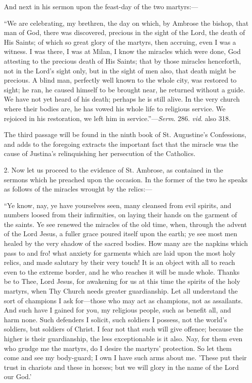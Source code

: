 And next in his sermon upon the feast-day of the two martyrs:—

``We are celebrating, my brethren, the day on which, by Ambrose
the bishop, that man of God, there was discovered, precious in the
sight of the Lord, the death of His Saints; of which so great glory of
the martyrs, then accruing, even I was a witness. I was there, I was
at Milan, I know the miracles which were done, God attesting to the
precious death of His Saints; that by those miracles henceforth, not
in the Lord's sight only, but in the sight of men also, that death might be precious. A blind man, perfectly well known to the
whole city, was restored to sight; he ran, he caused himself to be
brought near, he returned without a guide. We have not yet heard of
his death; perhaps he is still alive. In the very church where their
bodies are, he has vowed his whole life to religious service. We
rejoiced in his restoration, we left him in service.''—\emph{Serm}.
286. \emph{vid}. also 318.

The third passage will be found in the ninth book of St. Augustine's
Confessions, and adds to the foregoing extracts the important fact
that the miracle was the cause of Justina's relinquishing her
persecution of the Catholics.

2. Now let us proceed to the evidence of St. Ambrose, as contained
in the sermons which he preached upon the occasion. In the former of
the two he speaks as follows of the miracles wrought by the relics:—

``Ye know, nay, ye have yourselves seen, many cleansed from
evil spirits, and numbers loosed from their infirmities, on laying
their hands on the garment of the saints. Ye see renewed the miracles
of the old time, when, through the advent of the Lord Jesus, a fuller
grace poured itself upon the earth; ye see most men healed by the very
shadow of the sacred bodies. How many are the napkins which pass to
and fro! what anxiety for garments which are laid upon the most holy
relics, and made salutary by their very touch! It is an object with
all to reach even to the extreme border, and he who reaches it will be
made whole. Thanks be to Thee, Lord Jesus, for awakening for us at
this time the spirits of the holy martyrs, when Thy Church needs
greater guardianship. Let all understand the sort of champions I ask
for—those who may act as champions, not as assailants. And such have
I gained for you, my religious people, such as benefit all, and harm
none. Such defenders I solicit, such soldiers I possess, not the world's
soldiers, but soldiers of Christ. I fear not that such will give
offence; because the higher is their guardianship, the less
exceptionable is it also. Nay, for them even who grudge me the
martyrs, do I desire the martyrs' protection. So let them come and see
my body-guard; I own I have such arms about me. 'These put their trust
in chariots and these in horses; but we
will glory in the name of the Lord our God.'

